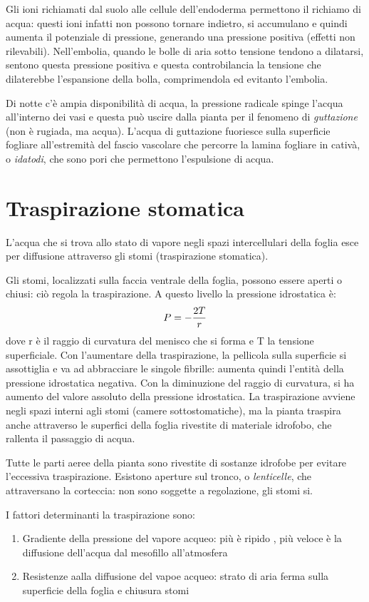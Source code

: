 \documentclass[a4paper,12pt]{book}
\begin{document}
Gli ioni richiamati dal suolo alle cellule dell'endoderma permettono il richiamo di acqua: questi ioni infatti non possono tornare indietro, si accumulano e quindi aumenta il potenziale di pressione, generando una pressione positiva (effetti non rilevabili).
Nell'embolia, quando le bolle di aria sotto tensione tendono a dilatarsi, sentono questa pressione positiva e questa controbilancia la tensione che dilaterebbe l'espansione della bolla, comprimendola ed evitanto l'embolia.

Di notte c'è ampia disponibilità di acqua, la pressione radicale spinge l'acqua all'interno dei vasi e questa può uscire dalla pianta per il fenomeno di \emph{guttazione} (non è rugiada, ma acqua). L'acqua di guttazione fuoriesce sulla superficie fogliare all'estremità del fascio vascolare che percorre la lamina fogliare in cativà, o \emph{idatodi}, che sono pori che permettono l'espulsione di acqua.


\section{Traspirazione stomatica}
L'acqua che si trova allo stato di vapore negli spazi intercellulari della foglia esce per diffusione attraverso gli stomi (traspirazione stomatica).

Gli stomi, localizzati sulla faccia ventrale della foglia, possono essere aperti o chiusi: ciò regola la traspirazione. A questo livello la pressione idrostatica è:
\begin{equation}
\centering
P = -\frac{2T}{r}
\end{equation}
dove r è il raggio di curvatura del menisco che si forma e T la tensione superficiale.
Con l'aumentare della traspirazione, la pellicola sulla superficie si assottiglia e va ad abbracciare le singole fibrille: aumenta quindi l'entità della pressione idrostatica negativa. Con la diminuzione del raggio di curvatura, si ha aumento del valore assoluto della pressione idrostatica.
La traspirazione avviene negli spazi interni agli stomi (camere sottostomatiche), ma la pianta traspira anche attraverso le superfici della foglia rivestite di materiale idrofobo, che rallenta il passaggio di acqua. 

Tutte le parti aeree della pianta sono rivestite di sostanze idrofobe per evitare l'eccessiva traspirazione.
Esistono aperture sul tronco, o \emph{lenticelle}, che attraversano la corteccia: non sono soggette a regolazione, gli stomi si.

I fattori determinanti la traspirazione sono:
\begin{enumerate}
\item{Gradiente della pressione del vapore acqueo: più è ripido , più veloce è la diffusione dell'acqua dal mesofillo all'atmosfera}
\item{Resistenze aalla diffusione del vapoe acqueo: strato di aria ferma sulla superficie della foglia e chiusura stomi}
\end{enumerate}
\end{document}
